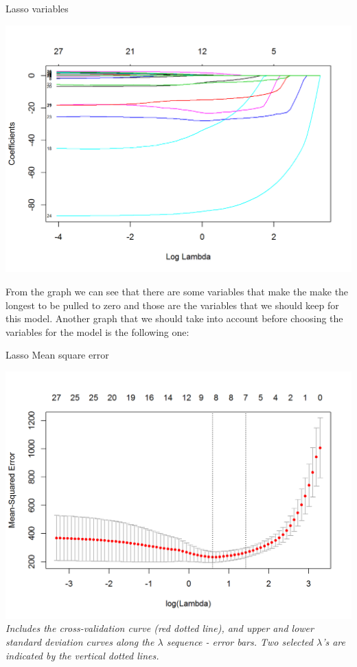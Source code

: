 \documentclass{book}
\begin{document}
\begin{table}[H]
\centering
\caption{Lasso variables}
\begin{center}
\includegraphics[scale=0.5]{../R/photos/70_lasso.png}   \\
\end{center}
\end{table}
From the graph we can see that there are some variables that make the make the longest to be pulled to zero and those are the variables that we should keep for this model.
Another graph that we should take into account before choosing the variables for the model is the following one:
\begin{table}[H]
\centering
\caption{Lasso Mean square error}
\begin{center}
\includegraphics[scale=0.5]{../R/photos/71_lassob.png}    \\
\textit{Includes the cross-validation curve (red dotted line), and upper and lower standard deviation curves along the $\lambda$ sequence - error bars. Two selected $\lambda$’s are indicated by the vertical dotted lines.}
\end{center}
\end{table}
\end{document}

